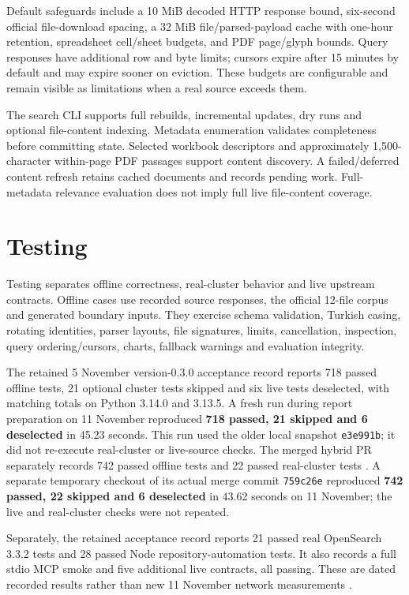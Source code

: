 \documentclass[a4paper,12pt]{report}
\newcommand{\code}[1]{\texttt{\small #1}}
\begin{document}
Default safeguards include a 10 MiB decoded HTTP response bound, six-second official file-download spacing, a 32 MiB file/parsed-payload cache with one-hour retention, spreadsheet cell/sheet budgets, and PDF page/glyph bounds. Query responses have additional row and byte limits; cursors expire after 15 minutes by default and may expire sooner on eviction. These budgets are configurable and remain visible as limitations when a real source exceeds them.

The search CLI supports full rebuilds, incremental updates, dry runs and optional file-content indexing. Metadata enumeration validates completeness before committing state. Selected workbook descriptors and approximately 1,500-character within-page PDF passages support content discovery. A failed/deferred content refresh retains cached documents and records pending work. Full-metadata relevance evaluation does not imply full live file-content coverage.

\section{Testing}
Testing separates offline correctness, real-cluster behavior and live upstream contracts. Offline cases use recorded source responses, the official 12-file corpus and generated boundary inputs. They exercise schema validation, Turkish casing, rotating identities, parser layouts, file signatures, limits, cancellation, inspection, query ordering/cursors, charts, fallback warnings and evaluation integrity.

The retained 5 November version-0.3.0 acceptance record reports 718 passed offline tests, 21 optional cluster tests skipped and six live tests deselected, with matching totals on Python 3.14.0 and 3.13.5. A fresh run during report preparation on 11 November reproduced \textbf{718 passed, 21 skipped and 6 deselected} in 45.23 seconds. This run used the older local snapshot \code{e3e991b}; it did not re-execute real-cluster or live-source checks. The merged hybrid PR separately records 742 passed offline tests and 22 passed real-cluster tests \cite{hybrid}. A separate temporary checkout of its actual merge commit \code{759c26e} reproduced \textbf{742 passed, 22 skipped and 6 deselected} in 43.62 seconds on 11 November; the live and real-cluster checks were not repeated.

Separately, the retained acceptance record reports 21 passed real OpenSearch 3.3.2 tests and 28 passed Node repository-automation tests. It also records a full stdio MCP smoke and five additional live contracts, all passing. These are dated recorded results rather than new 11 November network measurements \cite{acceptance}.
\end{document}
